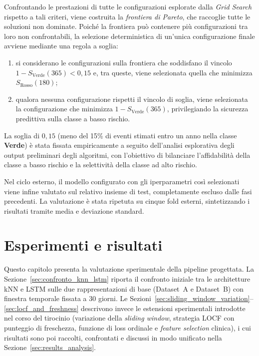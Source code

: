 \documentclass[a4paper,12pt]{report}
\begin{document}
Confrontando le prestazioni di tutte le configurazioni esplorate dalla \textit{Grid Search} rispetto a tali criteri, viene costruita la \textit{frontiera di Pareto}, che raccoglie tutte le soluzioni non dominate. Poiché la frontiera può contenere più configurazioni tra loro non confrontabili, la selezione deterministica di un'unica configurazione finale avviene mediante una regola a soglia:
\begin{enumerate}
    \item si considerano le configurazioni sulla frontiera che soddisfano il vincolo \(1 - S_{\text{Verde}}(365) < 0{,}15\) e, tra queste, viene selezionata quella che minimizza \(S_{\text{Rosso}}(180)\);
    \item qualora nessuna configurazione rispetti il vincolo di soglia, viene selezionata la configurazione che minimizza \(1 - S_{\text{Verde}}(365)\), privilegiando la sicurezza predittiva sulla classe a basso rischio.
\end{enumerate}
La soglia di \(0{,}15\) (meno del 15\% di eventi stimati entro un anno nella classe \textbf{Verde}) è stata fissata empiricamente a seguito dell'analisi esplorativa degli output preliminari degli algoritmi, con l'obiettivo di bilanciare l'affidabilità della classe a basso rischio e la selettività della classe ad alto rischio.

Nel ciclo esterno, il modello configurato con gli iperparametri così selezionati viene infine valutato sul relativo insieme di test, completamente escluso dalle fasi precedenti. La valutazione è stata ripetuta su cinque fold esterni, sintetizzando i risultati tramite media e deviazione standard.

\chapter{Esperimenti e risultati}
\label{cap:risultati}

Questo capitolo presenta la valutazione sperimentale della pipeline progettata. La Sezione~\ref{sec:confronto_knn_lstm} riporta il confronto iniziale tra le architetture kNN e LSTM sulle due rappresentazioni di base (Dataset~A e Dataset~B) con finestra temporale fissata a 30 giorni. Le Sezioni~\ref{sec:sliding_window_variation}--\ref{sec:locf_and_freshness} descrivono invece le estensioni sperimentali introdotte nel corso del tirocinio (variazione della \textit{sliding window}, strategia LOCF con punteggio di freschezza, funzione di loss ordinale e \textit{feature selection} clinica), i cui risultati sono poi raccolti, confrontati e discussi in modo unificato nella Sezione~\ref{sec:results_analysis}.
\end{document}
